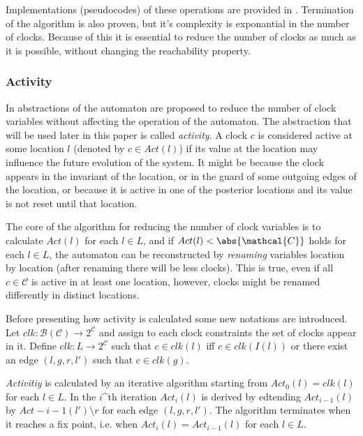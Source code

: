 
Implementations (pseudocodes) of these operations are provided in \cite{bengtsson2004timed}. Termination of the algorithm is also proven, but it's complexity is exponantial in the number of clocks. Because of this it is essential to reduce the number of clocks as much as it is possible, without changing the reachability property.

\subsubsection{Activity}

In \cite{RSS96*73} abstractions of the automaton are proposed to reduce the number of clock variables without affecting the operation of the automaton. The abstraction that will be used later in this paper is called \emph{activity}. A clock $c$ is considered active  at some location $l$ (denoted by $c \in Act(l)$) if its value  at the location may influence the future evolution of the system. It might be because the clock appears in the invariant of the location, or in the guard of some outgoing edges of the location, or because it is active in one of the posterior locations and its value is not reset until that location.


The core of the algorithm for reducing the number of clock variables is to calculate $Act(l)$ for each $l \in L$, and if $Act(l)<\abs{\mathcal{C}}$ holds for each $l \in L$, the automaton can be reconstructed by \emph{renaming} variables location by location (after renaming there will be less clocks). This is true, even if all $c \in \mathcal{C}$ is active in at least one location, however, clocks might be renamed differently in distinct locations.

Before presenting how activity is calculated some new notations are introduced. Let $clk: \mathcal{B}(\mathcal{C}) \to 2^\mathcal{C}$ and assign to each clock constraints the set of clocks appear in it. Define $clk:L \to  2^\mathcal{C}$ such that $c \in clk(l)$ iff $c \in clk(I(l))$ or there exist an edge $(l,g,r,l')$ such that $c \in clk(g)$.

\emph{Activitiy} is calculated by an iterative algorithm starting from $Act_0(l)=clk(l)$ for each $l \in L$. In the $i$^{th} iteration $Act_{i}(l)$ is derived by edtending $Act_{i-1}(l)$ by $Act-{i-1}(l')\setminus r$ for each edge $(l,g,r,l')$. The algorithm terminates when it reaches a fix point, i.e. when $Act_{i}(l)=Act_{i-1}(l)$ for each $l\in L$.


